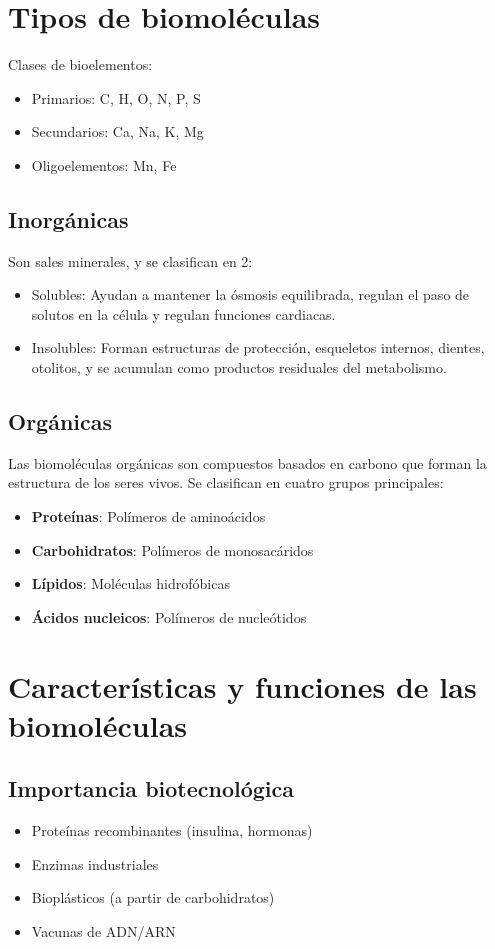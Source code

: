 \section{Tipos de biomoléculas}

Clases de bioelementos:

\begin{itemize}
    \item Primarios: C, H, O, N, P, S
    \item Secundarios: Ca, Na, K, Mg
    \item Oligoelementos: Mn, Fe
\end{itemize}

\subsection{Inorgánicas}

Son sales minerales, y se clasifican en 2:

\begin{itemize}
    \item Solubles: Ayudan a mantener la ósmosis equilibrada, regulan el paso de solutos en la célula y regulan funciones cardiacas.
    \item Insolubles: Forman estructuras de protección, esqueletos internos, dientes, otolitos, y se acumulan como productos residuales del metabolismo.
\end{itemize}

\subsection{Orgánicas}

Las biomoléculas orgánicas son compuestos basados en carbono que forman la estructura de los seres vivos. Se clasifican en cuatro grupos principales:

\begin{itemize}
    \item \textbf{Proteínas}: Polímeros de aminoácidos
    \item \textbf{Carbohidratos}: Polímeros de monosacáridos
    \item \textbf{Lípidos}: Moléculas hidrofóbicas
    \item \textbf{Ácidos nucleicos}: Polímeros de nucleótidos
\end{itemize}

\section{Características y funciones de las biomoléculas}

    

\subsection{Importancia biotecnológica}
\begin{itemize}
    \item Proteínas recombinantes (insulina, hormonas)
    \item Enzimas industriales
    \item Bioplásticos (a partir de carbohidratos)
    \item Vacunas de ADN/ARN
\end{itemize}